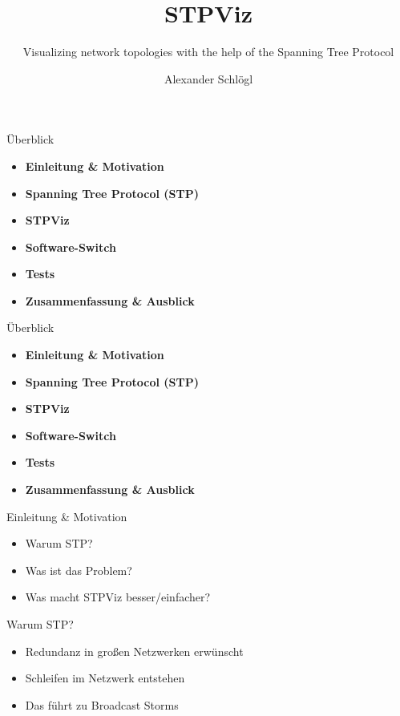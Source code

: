 \documentclass{beamer}
\title{STPViz}
\subtitle{Visualizing network topologies with the help of the Spanning Tree Protocol}
\author{Alexander Schlögl}
\begin{document}
\begin{frame}[plain]
    \maketitle
\end{frame}

\begin{frame}{Überblick}
    \begin{itemize}
        \item \textbf{Einleitung \& Motivation}
        \item \textbf{Spanning Tree Protocol (STP)}
        \item \textbf{STPViz}
        \item \textbf{Software-Switch}
        \item \textbf{Tests}
        \item \textbf{Zusammenfassung \& Ausblick}
    \end{itemize}
\end{frame}

\begin{frame}{Überblick}
    \begin{itemize}
        \item \alert{\textbf{Einleitung \& Motivation}}
        \item \textbf{Spanning Tree Protocol (STP)}
        \item \textbf{STPViz}
        \item \textbf{Software-Switch}
        \item \textbf{Tests}
        \item \textbf{Zusammenfassung \& Ausblick}
    \end{itemize}
\end{frame}

\begin{frame}{Einleitung \& Motivation}
    \begin{itemize}
        \item Warum STP?
        \item Was ist das Problem?
        \item Was macht STPViz besser/einfacher?
    \end{itemize}
\end{frame}

\begin{frame}{Warum STP?}
    \begin{itemize}[<+->]
        \item Redundanz in großen Netzwerken erwünscht
        \item Schleifen im Netzwerk entstehen
        \item Das führt zu Broadcast Storms
    \end{itemize}
\end{frame}
\end{document}
